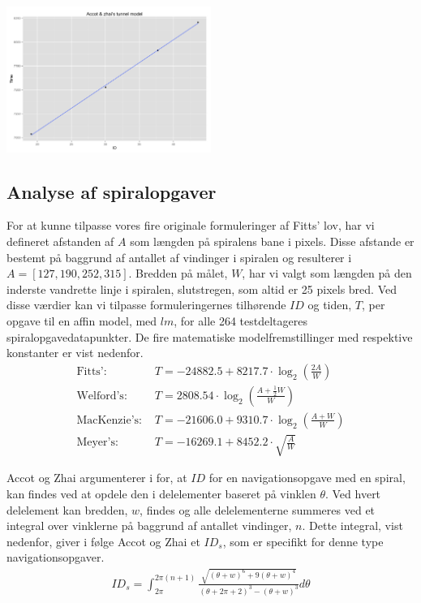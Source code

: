 \begin{minipage}{\linewidth}
	\begin{minipage}[t]{\linewidth}
		\centering
		\includegraphics[width=0.5\textwidth]{images/plots/plot_model_tunnel_accot}
		\label{fig:accot_tunnel_line}
	\end{minipage}
\end{minipage}

\newpage
{}
\subsection*{Analyse af spiralopgaver}
For at kunne tilpasse vores fire originale formuleringer af Fitts' lov, har vi defineret afstanden af $A$ som længden på spiralens bane i pixels. Disse afstande er bestemt på baggrund af antallet af vindinger i spiralen og resulterer i $A = [127,190,252,315]$. Bredden på målet, $W$, har vi valgt som længden på den inderste vandrette linje i spiralen, slutstregen, som altid er 25 pixels bred. Ved disse værdier kan vi tilpasse formuleringernes tilhørende $ID$ og tiden, $T$, per opgave til en affin model, med $lm$, for alle 264 testdeltageres spiralopgavedatapunkter. De fire matematiske modelfremstillinger med respektive konstanter er vist nedenfor.
\begin{align*}
\text{Fitts': } &T = -24882.5+ 8217.7 \cdot \log_2\left(\frac{2A}{W}\right)\\
\text{Welford's: } &T =  2808.54\cdot \log_2\left(\frac{A+\frac{1}{2}W}{W}\right)\\
\text{MacKenzie's: } &T = -21606.0 + 9310.7\cdot \log_2\left(\frac{A+W}{W}\right)\\
\text{Meyer's: } &T = -16269.1 + 8452.2 \cdot \sqrt{\frac{A}{W}}
\end{align*}

Accot og Zhai argumenterer i \cite{accot1997} for, at $ID$ for en navigationsopgave med en spiral, kan findes ved at opdele den i delelementer baseret på vinklen $\theta$. Ved hvert delelement kan bredden, $w$, findes og alle delelementerne summeres ved et integral over vinklerne på baggrund af antallet vindinger, $n$. Dette integral, vist nedenfor, giver i følge Accot og Zhai et $ID_s$, som er specifikt for denne type navigationsopgaver. 
\begin{align*}
ID_s = \int_{2\pi}^{2\pi(n+1)}\frac{\sqrt{\left(\theta+w\right)^6+9\left(\theta+w\right)^4}}{\left(\theta+2\pi+2\right)^3-\left(\theta+w\right)^3}d\theta
\end{align*}

